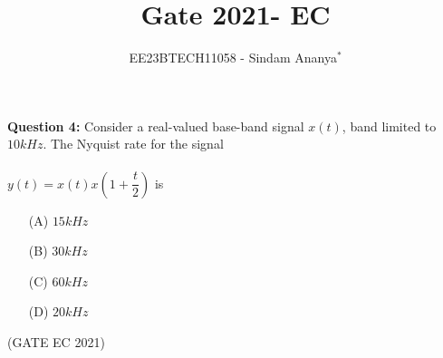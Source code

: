 \documentclass[journal,12pt,twocolumn]{IEEEtran}
\theoremstyle{remark}
\begin{document}

\vspace{3cm}

\title{Gate 2021- EC}
\author{EE23BTECH11058 - Sindam Ananya$^{*}$%
}
\maketitle
\newpage
\bigskip

\renewcommand{\thefigure}{\theenumi}
\renewcommand{\thetable}{\theenumi}

\vspace{3cm}
\textbf{Question 4:} 
Consider a real-valued base-band signal $x(t)$, band limited to $10kHz$. The Nyquist rate for the signal \\\\
$y(t) = x(t)x(1+\dfrac{t}{2})$ is\\

\begin{enumerate}
\item[(A)] $15kHz$
\item[(B)] $30kHz$
\item[(C)] $60kHz$
\item[(D)] $20kHz$
\end{enumerate}
\hfill{(GATE EC 2021)}\\
\solution
\end{document}
